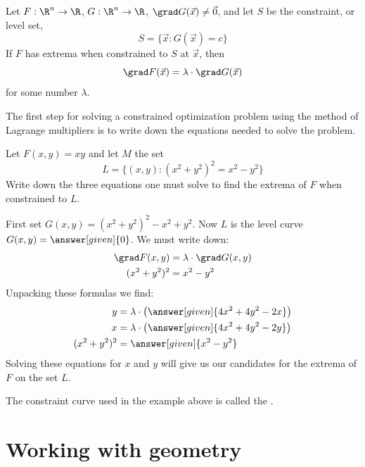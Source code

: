 \documentclass{ximera}
\begin{document}
\begin{theorem}
  Let $F:\R^n\to\R$, $G:\R^n\to\R$, $\grad G(\vec{x}) \ne \vec{0}$,
  and let $S$ be the constraint, or level set,
  \[
  S = \{\vec{x}: G(\vec{x}) = c\}
  \]
  If $F$ has extrema when constrained to $S$ at $\vec{x}$, then
  \[
  \grad F(\vec{x}) = \lambda \cdot \grad G(\vec{x})
  \]
  for some number $\lambda$.
\end{theorem}

The first step for solving a constrained optimization problem using
the method of Lagrange multipliers is to write down the equations
needed to solve the problem.

\begin{example}
  Let $F(x,y) = xy$ and let $M$ the set
  \[
  L = \{(x,y):(x^2+y^2)^2 = x^2-y^2\}
  \]
  Write down the three equations one must solve to find the extrema of
  $F$ when constrained to $L$.
  \begin{explanation}
    First set $G(x,y)= (x^2+y^2)^2 - x^2 +y^2$. Now $L$ is the level
    curve $G(x,y) =\answer[given]{0}$.  We must write down:
    \begin{align*}
      \grad F(x,y) &= \lambda \cdot \grad G(x,y)\\
      (x^2+y^2)^2 &= x^2-y^2
    \end{align*}
    Unpacking these formulas we find:
    \begin{align*}
      y &= \lambda \cdot \left(\answer[given]{4x^2+4y^2-2x}\right)\\
      x &= \lambda \cdot \left(\answer[given]{4x^2+4y^2-2y}\right)\\
      (x^2+y^2)^2 &= \answer[given]{x^2-y^2}
    \end{align*}
    Solving these equations for $x$ and $y$ will give us our
    candidates for the extrema of $F$ on the set $L$.
  \end{explanation}
\end{example}

\begin{remark}
  The constraint curve used in the example above is called the .
\end{remark}

  


\section{Working with geometry}
\end{document}
